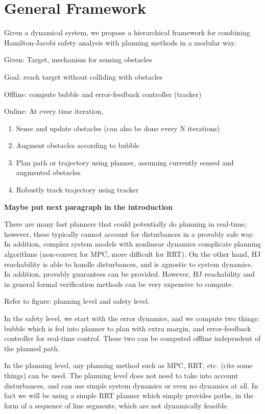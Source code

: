 \section{General Framework \label{sec:framework}}
Given a dynamical system, we propose a hierarchical framework for combining Hamilton-Jacobi safety analysis with planning methods in a modular way.

Given: Target, mechanism for sensing obstacles

Goal: reach target without colliding with obstacles

Offline: compute bubble and error-feedback controller (tracker)

Online: At every time iteration,
\begin{enumerate}
  \item Sense and update obstacles (can also be done every N iterations)
  \item Augment obstacles according to bubble
  \item Plan path or trajectory using planner, assuming currently sensed and augmented obstacles
  \item Robustly track trajectory using tracker
\end{enumerate}


\textbf{Maybe put next paragraph in the introduction}

There are many fast planners that could potentially do planning in real-time; however, these typically cannot account for disturbances in a provably safe way. In addition, complex system models with nonlinear dynamics complicate planning algorithms (non-convex for MPC, more difficult for RRT). On the other hand, HJ reachability is able to handle disturbances, and is agnostic to system dynamics. In addition, provably guarantees can be provided. However, HJ reachability and in general formal verification methods can be very expensive to compute.

Refer to figure: planning level and safety level. 

In the safety level, we start with the error dynamics, and we compute two things: bubble which is fed into planner to plan with extra margin, and error-feedback controller for real-time control. These two can be computed offline independent of the planned path.

In the planning level, any planning method such as MPC, RRT, etc. (cite some things) can be used. The planning level does not need to take into account disturbances, and can use simple system dynamics or even no dynamics at all. In fact we will be using a simple RRT planner which simply provides paths, in the form of a sequence of line segments, which are not dynamically feasible. 
